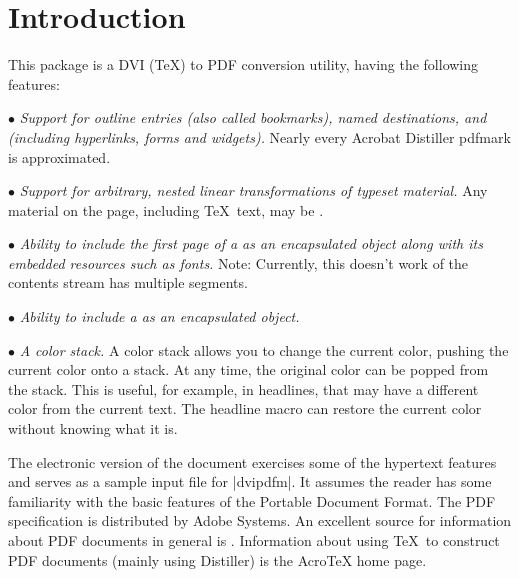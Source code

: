 {\section{Introduction}
This package is a DVI (\TeX) to PDF conversion utility,
having the following features:

\beginlist
\item{$\bullet$} {\it Support for outline entries (also called bookmarks), named destinations,
and  (including hyperlinks, forms and widgets).}  Nearly
every Acrobat Distiller pdfmark is approximated.

\item{$\bullet$} {\it Support for arbitrary, nested linear transformations
of typeset material.}  Any material on the page, including
\TeX\ text, may be   .

\item{$\bullet$} {\it Ability to include the first page of a  as
an encapsulated object along with its embedded resources such as fonts.}
Note:  Currently, this doesn't work of the contents stream
has multiple segments. 

\item{$\bullet$} {\it Ability to include a  as an encapsulated
object.}

\item{$\bullet$} {\it A color stack.} A color stack allows you to change the current color, pushing the
current color onto a stack.  At any time, the original color
can be popped from the stack.  This is useful, for example, in
headlines, that may have a different color from the current text.
The headline macro can restore the current color without knowing
what it is.
\endlist

The electronic version of the document exercises
some of the hypertext features and serves as
a sample input file for |dvipdfm|.
It assumes the reader has some familiarity with the basic features
of the Portable Document Format.  The PDF specification
is distributed by Adobe Systems.
An excellent source for information about PDF documents
in general is .  Information about
using \TeX\ to construct PDF documents (mainly using Distiller) is the
AcroTeX home page.

}
